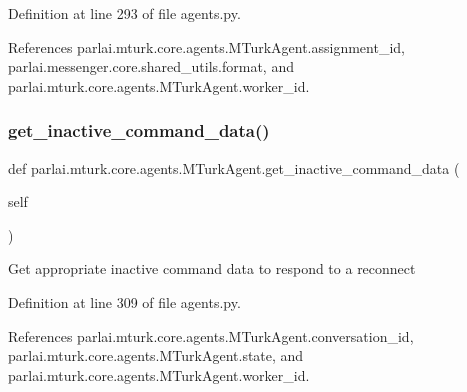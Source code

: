 Definition at line 293 of file agents.\+py.



References parlai.\+mturk.\+core.\+agents.\+M\+Turk\+Agent.\+assignment\+\_\+id, parlai.\+messenger.\+core.\+shared\+\_\+utils.\+format, and parlai.\+mturk.\+core.\+agents.\+M\+Turk\+Agent.\+worker\+\_\+id.

\mbox{\label{classparlai_1_1mturk_1_1core_1_1agents_1_1MTurkAgent_aa8b6eaf6532f10dabeb1ab8c3de98ec0}} 
\subsubsection{\texorpdfstring{get\+\_\+inactive\+\_\+command\+\_\+data()}{get\_inactive\_command\_data()}}
{\footnotesize\ttfamily def parlai.\+mturk.\+core.\+agents.\+M\+Turk\+Agent.\+get\+\_\+inactive\+\_\+command\+\_\+data (\begin{DoxyParamCaption}\item[{}]{self }\end{DoxyParamCaption})}

\begin{DoxyVerb}Get appropriate inactive command data to respond to a reconnect\end{DoxyVerb}
 

Definition at line 309 of file agents.\+py.



References parlai.\+mturk.\+core.\+agents.\+M\+Turk\+Agent.\+conversation\+\_\+id, parlai.\+mturk.\+core.\+agents.\+M\+Turk\+Agent.\+state, and parlai.\+mturk.\+core.\+agents.\+M\+Turk\+Agent.\+worker\+\_\+id.

\mbox{\label{classparlai_1_1mturk_1_1core_1_1agents_1_1MTurkAgent_a7d8989acb53debf63fc11246510f83b7}} 
